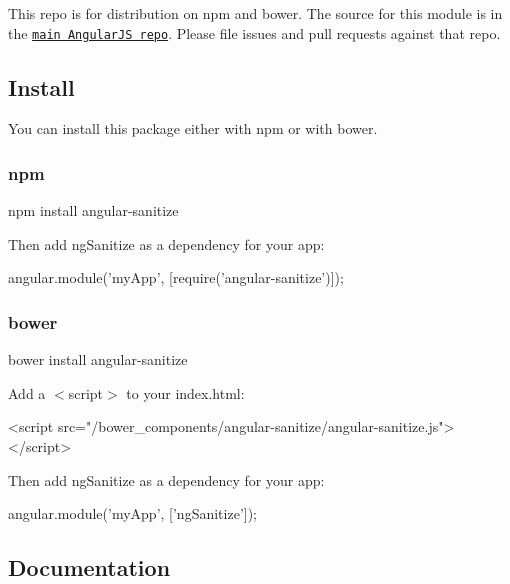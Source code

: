 This repo is for distribution on {\ttfamily npm} and {\ttfamily bower}. The source for this module is in the \href{https://github.com/angular/angular.js/tree/master/src/ngSanitize}{\tt main Angular\+JS repo}. Please file issues and pull requests against that repo.

\subsection*{Install}

You can install this package either with {\ttfamily npm} or with {\ttfamily bower}.

\subsubsection*{npm}


\begin{DoxyCode}
npm install angular-sanitize
\end{DoxyCode}


Then add {\ttfamily ng\+Sanitize} as a dependency for your app\+:


\begin{DoxyCode}
angular.module('myApp', [require('angular-sanitize')]);
\end{DoxyCode}


\subsubsection*{bower}


\begin{DoxyCode}
bower install angular-sanitize
\end{DoxyCode}


Add a {\ttfamily $<$script$>$} to your {\ttfamily index.\+html}\+:


\begin{DoxyCode}
<script src="/bower\_components/angular-sanitize/angular-sanitize.js"></script>
\end{DoxyCode}


Then add {\ttfamily ng\+Sanitize} as a dependency for your app\+:


\begin{DoxyCode}
angular.module('myApp', ['ngSanitize']);
\end{DoxyCode}


\subsection*{Documentation}

